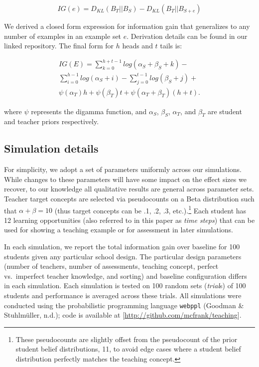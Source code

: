 \documentclass[10pt, letterpaper]{article}
\begin{document}
\[IG(e) = D_{KL}(B_T ||B_S) - D_{KL}(B_T || B_{S+e})\]

We derived a closed form expression for information gain that
generalizes to any number of examples in an example set \(e\).
Derivation details can be found in our linked repository. The final form
for \(h\) heads and \(t\) tails is:

\begin{multline}
IG(E) = \sum_{k=0}^{h+t-1} {log(\alpha_S + \beta_S + k)} - \\
\sum_{i=0}^{h-1} {log (\alpha_S + i)} - \sum_{j=0}^{t-1} {log(\beta_S +j)} + \\
\psi(\alpha_T)h + \psi(\beta_T)t +  \psi(\alpha_T + \beta_T)(h+t).
\end{multline}

\noindent where \(\psi\) represents the digamma function, and
\(\alpha_S\), \(\beta_S\), \(\alpha_T\), and \(\beta_T\) are student and
teacher priors respectively.

\subsection{Simulation details}\label{simulation-details}

For simplicity, we adopt a set of parameters uniformly across our
simulations. While changes to these parameters will have some impact on
the effect sizes we recover, to our knowledge all qualitative results
are general across parameter sets. Teacher target concepts are selected
via pseudocounts on a Beta distribution such that
\(\alpha + \beta = 10\) (thus target concepts can be .1, .2, .3,
etc.).\footnote{These pseudocounts are slightly offset from the pseudocount of the prior student belief distributions, 11, to avoid edge cases where a student belief distribution perfectly matches the teaching concept.}
Each student has 12 learning opportunities (also referred to in this
paper as \emph{time steps}) that can be used for showing a teaching
example or for assessment in later simulations.

In each simulation, we report the total information gain over baseline
for 100 students given any particular school design. The particular
design parameters (number of teachers, number of assessments, teaching
concept, perfect vs.~imperfect teacher knowledge, and sorting) and
baseline configuration differs in each simulation. Each simulation is
tested on 100 random sets (\emph{trial}s) of 100 students and
performance is averaged across these trials. All simulations were
conducted using the probabilistic programming language \texttt{webppl}
(Goodman \& Stuhlmüller, n.d.); code is available at
{[}\url{http://github.com/mcfrank/teaching}{]}.
\end{document}
